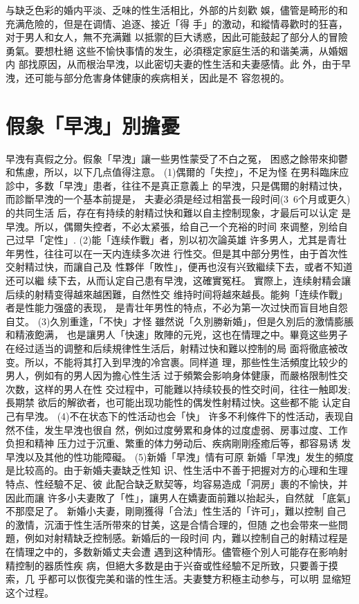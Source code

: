 \documentclass[12pt,UTF8]{ctexbook}
\begin{document}
与缺乏色彩的婚内平淡、乏味的性生活相比，外部的片刻歡
娛，儘管是畸形的和充满危險的，但是在调情、追逐、接近「得
手」的激动，和縱情尋歡时的狂喜，对于男人和女人，無不充满難
以抵禦的巨大诱惑，因此可能鼓起了部分人的冒險勇氣。要想杜絕
这些不愉快事情的发生，必須穩定家庭生活的和谐美满，从婚姻内
部找原因，从而根治早洩，以此密切夫妻的性生活和夫妻感情。此
外，由于早洩，还可能与部分危害身体健康的疾病相关，因此是不
容忽視的。

\section{假象「早洩」別擔憂}

早洩有真假之分。假象「早洩」讓一些男性蒙受了不白之冤，
困惑之餘带來抑鬱和焦慮，所以，以下几点值得注意。
(1)偶爾的「失控」，不足为怪
在男科臨床应診中，多数「早洩」患者，往往不是真正意義上
的早洩，只是偶爾的射精过快，而診斷早洩的一个基本前提是，
夫妻必須是经过相當長一段时间(3~6个月或更久)的共同生活
后，存在有持续的射精过快和難以自主控制现象，才最后可以认定
是早洩。所以，偶爾失控者，不必太紧張，给自己一个充裕的时间
來调整，別给自己过早「定性」.
(2)能「连续作戰」者，別以初次論英雄
许多男人，尤其是青壮年男性，往往可以在一天内连续多次进
行性交。但是其中部分男性，由于首次性交射精过快，而讓自己及
性夥伴「敗性」，便再也沒有兴致繼续下去，或者不知道还可以繼
续下去，从而认定自己患有早洩，这確實冤枉。
實際上，连续射精会讓后续的射精变得越來越困難，自然性交
维持时间将越來越長。能夠「连续作戰」者是性能力强盛的表现，
是青壮年男性的特点，不必为第一次过快而盲目地自怨自艾。
(3)久別重逢，「不快」才怪
雖然说「久別勝新婚」，但是久別后的激情膨脹和精液飽满，
也是讓男人「快速」敗陣的元兇，这也在情理之中。畢竟这些男子
在经过适当的调整和后续規律性生活后，射精过快和難以控制的局
面将徹底被改变。所以，不能将其打入到早洩的冷宫裹。同样道
理，那些性生活頻度比较少的男人，例如有的男人因为擔心性生活
过于頻繁会影响身体健康，而嚴格限制性交次数，这样的男人在性
交过程中，可能難以持续较長的性交时间，往往一触即发;長期禁
欲后的解欲者，也可能出现功能性的偶发性射精过快。这些都不能
认定自己有早洩。
(4)不在状态下的性活动也会「快」
许多不利條件下的性活动，表现自然不佳，发生早洩也很自
然，例如过度勞累和身体的过度虚弱、房事过度、工作负担和精神
压力过于沉重、繁重的体力勞动后、疾病剛剛痊癒后等，都容易诱
发早洩以及其他的性功能障礙。
(5)新婚「早洩」情有可原
新婚「早洩」发生的頻度是比较高的。由于新婚夫妻缺乏性知
识、性生活中不善于把握对方的心理和生理特点、性经驗不足、彼
此配合缺乏默契等，均容易造成「洞房」裹的不愉快，并因此而讓
许多小夫妻敗了「性」，讓男人在嬌妻面前難以抬起头，自然就
「底氣」不那麼足了。
新婚小夫妻，剛剛獲得「合法」性生活的「许可」，難以控制
自己的激情，沉湎于性生活所带來的甘美，这是合情合理的，但随
之也会带來一些問題，例如对射精缺乏控制感。新婚后的一段时间
内，難以控制自己的射精过程是在情理之中的，多数新婚丈夫会遭
遇到这种情形。儘管極个別人可能存在影响射精控制的器质性疾
病，但絕大多数是由于兴奋或性经驗不足所致，只要善于摸索，几
乎都可以恢復完美和谐的性生活。夫妻雙方积極主动参与，可以明
显缩短这个过程。
\end{document}
